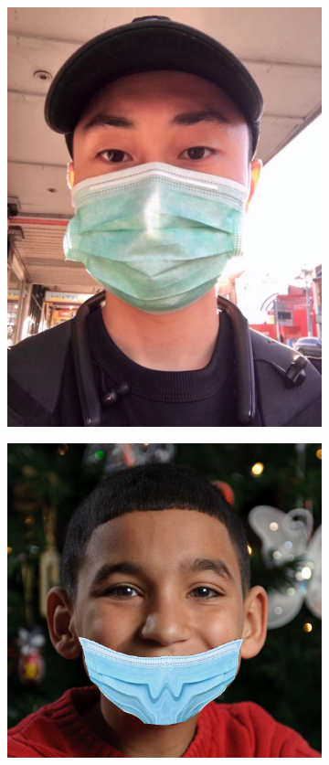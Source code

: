 \begin{figure}[htp]
\begin{subfigure}{0.2\linewidth}
		\includegraphics[width=\linewidth]{imagenes/dataset1-2.jpg}
		\caption{}
		\label{fig:1b}
	\end{subfigure}\hfill	
	\begin{subfigure}{0.2\linewidth}
		\includegraphics[width=\linewidth]{imagenes/dataset1-3.jpg}

\end{subfigure}
\end{figure}
